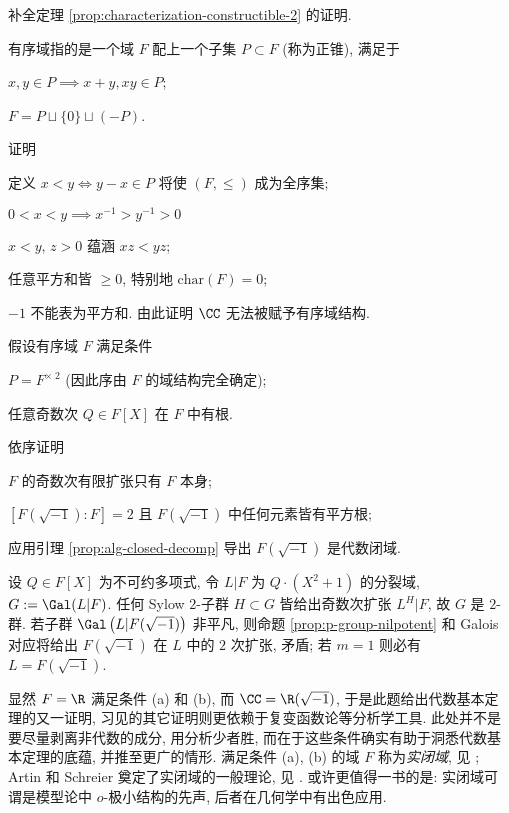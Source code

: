 \begin{Exercises}
	\item 补全定理 \ref{prop:characterization-constructible-2} 的证明.
	\item 有序域指的是一个域 $F$ 配上一个子集 $P \subset F$ (称为正锥), 满足于
		\begin{compactitem}
			\item $x, y \in P \implies x+y, xy \in P$;
			\item $F = P \sqcup \{0\} \sqcup (-P)$.
		\end{compactitem}
		证明
		\begin{compactenum}[(i)]
			\item 定义 $x < y \iff y-x \in P$ 将使 $(F, \leq)$ 成为全序集;
			\item $0 < x < y \implies x^{-1} > y^{-1} > 0$
			\item $x < y$, $z > 0$ 蕴涵 $xz < yz$;
			\item 任意平方和皆 $\geq 0$, 特别地 $\text{char}(F)=0$;
			\item $-1$ 不能表为平方和. 由此证明 $\CC$ 无法被赋予有序域结构.
		\end{compactenum}
	\item 假设有序域 $F$ 满足条件
		\begin{inparaenum}[(a)]
			\item $P = F^{\times\; 2}$ (因此序由 $F$ 的域结构完全确定);
			\item 任意奇数次 $Q \in F[X]$ 在 $F$ 中有根.
		\end{inparaenum}
		依序证明
		\begin{compactenum}[(i)]
			\item $F$ 的奇数次有限扩张只有 $F$ 本身;
			\item $\left[ F(\sqrt{-1}) : F \right]=2$ 且 $F(\sqrt{-1})$ 中任何元素皆有平方根;
			\item 应用引理 \ref{prop:alg-closed-decomp} 导出 $F(\sqrt{-1})$ 是代数闭域.
		\end{compactenum}
		\begin{hint}
			设 $Q \in F[X]$ 为不可约多项式, 令 $L|F$ 为 $Q \cdot (X^2+1)$ 的分裂域, $G := \Gal(L|F)$. 任何 Sylow $2$-子群 $H \subset G$ 皆给出奇数次扩张 $L^H | F$, 故 $G$ 是 $2$-群. 若子群 $\Gal\left( L|F(\sqrt{-1})\right)$ 非平凡, 则命题 \ref{prop:p-group-nilpotent} 和 Galois 对应将给出 $F(\sqrt{-1})$ 在 $L$ 中的 $2$ 次扩张, 矛盾; 若 $m=1$ 则必有 $L=F(\sqrt{-1})$.
		\end{hint}

		显然 $F=\R$ 满足条件 (a) 和 (b), 而 $\CC = \R(\sqrt{-1})$, 于是此题给出代数基本定理的又一证明, 习见的其它证明则更依赖于复变函数论等分析学工具. 此处并不是要尽量剥离非代数的成分, 用分析少者胜, 而在于这些条件确实有助于洞悉代数基本定理的底蕴, 并推至更广的情形. 满足条件 (a), (b) 的域 $F$ 称为\emph{实闭域}, 见 \cite[第 9 章]{Feng17}; Artin 和 Schreier 奠定了实闭域的一般理论, 见 \cite[Chapter XI]{Lang02}. 或许更值得一书的是: 实闭域可谓是模型论中 $o$-极小结构的先声, 后者在几何学中有出色应用. 
\end{Exercises}
